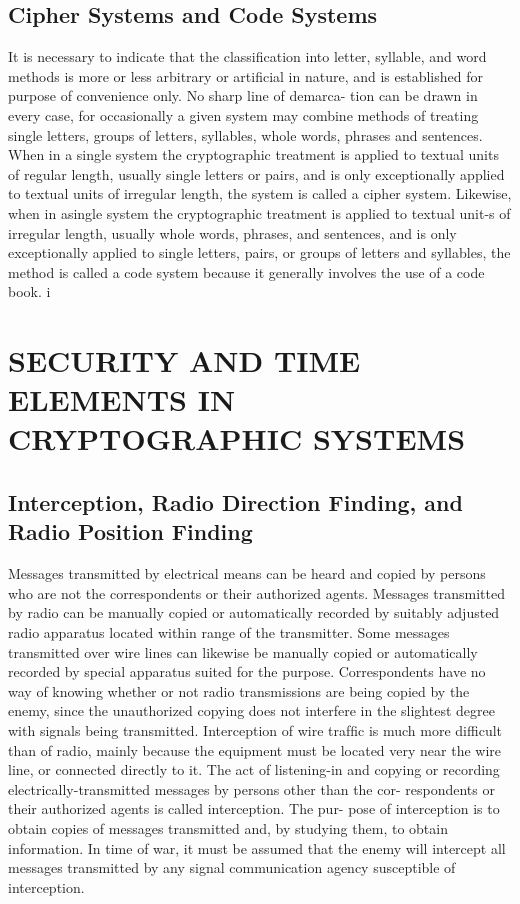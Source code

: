 \subsection{Cipher Systems and Code Systems}

It is necessary to indicate that the classiﬁcation into letter, syllable,
and word methods is more or less arbitrary or artiﬁcial in nature, and is
established for purpose of convenience only. No sharp line of demarca-
tion can be drawn in every case, for occasionally a given system may
combine methods of treating single letters, groups of letters, syllables,
whole words, phrases and sentences. When in a single system the
cryptographic treatment is applied to textual units of regular length,
usually single letters or pairs, and is only exceptionally applied to textual
units of irregular length, the system is called a cipher system. Likewise,
when in asingle system the cryptographic treatment is applied to textual
unit-s of irregular length, usually whole words, phrases, and sentences,
and is only exceptionally applied to single letters, pairs, or groups of
letters and syllables, the method is called a code system because it
generally involves the use of a code book. i

 

\section{SECURITY AND TIME ELEMENTS IN CRYPTOGRAPHIC SYSTEMS}

\subsection{Interception, Radio Direction Finding, and Radio Position Finding}

\mypara Messages transmitted by electrical means can be heard and copied
by persons who are not the correspondents or their authorized agents.
Messages transmitted by radio can be manually copied or automatically
recorded by suitably adjusted radio apparatus located within range of the
transmitter. Some messages transmitted over wire lines can likewise be
manually copied or automatically recorded by special apparatus suited
for the purpose. Correspondents have no way of knowing whether or not
radio transmissions are being copied by the enemy, since the unauthorized
copying does not interfere in the slightest degree with signals being
transmitted. Interception of wire trafﬁc is much more difficult than of
radio, mainly because the equipment must be located very near the wire
line, or connected directly to it. The act of listening-in and copying or
recording electrically-transmitted messages by persons other than the cor-
respondents or their authorized agents is called interception. The pur-
pose of interception is to obtain copies of messages transmitted and, by
studying them, to obtain information. In time of war, it must be assumed
that the enemy will intercept all messages transmitted by any signal
communication agency susceptible of interception.

